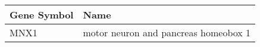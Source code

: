 \begin{tabular}{ll}
\toprule
Gene Symbol &                                 Name \\
\midrule
       MNX1 & motor neuron and pancreas homeobox 1 \\
\bottomrule
\end{tabular}
